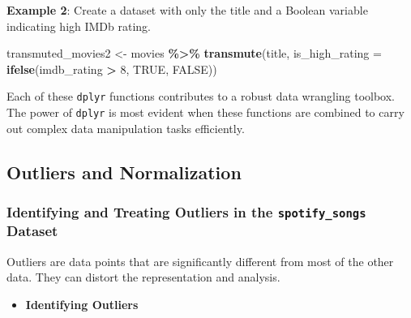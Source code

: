 \documentclass[
  b5paper]{book}
\newenvironment{Shaded}{\begin{snugshade}}{\end{snugshade}}
\newcommand{\AttributeTok}[1]{\textcolor[rgb]{0.13,0.29,0.53}{#1}}
\newcommand{\ConstantTok}[1]{\textcolor[rgb]{0.56,0.35,0.01}{#1}}
\newcommand{\DecValTok}[1]{\textcolor[rgb]{0.00,0.00,0.81}{#1}}
\newcommand{\FunctionTok}[1]{\textcolor[rgb]{0.13,0.29,0.53}{\textbf{#1}}}
\newcommand{\NormalTok}[1]{#1}
\newcommand{\OtherTok}[1]{\textcolor[rgb]{0.56,0.35,0.01}{#1}}
\newcommand{\SpecialCharTok}[1]{\textcolor[rgb]{0.81,0.36,0.00}{\textbf{#1}}}
\providecommand{\tightlist}{%
  \setlength{\itemsep}{0pt}\setlength{\parskip}{0pt}}
\begin{document}
\textbf{Example 2}: Create a dataset with only the title and a Boolean variable indicating high IMDb rating.

\begin{Shaded}
\begin{Highlighting}[]
\NormalTok{transmuted\_movies2 }\OtherTok{\textless{}{-}}\NormalTok{ movies }\SpecialCharTok{\%\textgreater{}\%}
  \FunctionTok{transmute}\NormalTok{(title, }\AttributeTok{is\_high\_rating =} \FunctionTok{ifelse}\NormalTok{(imdb\_rating }\SpecialCharTok{\textgreater{}} \DecValTok{8}\NormalTok{, }\ConstantTok{TRUE}\NormalTok{, }\ConstantTok{FALSE}\NormalTok{))}
\end{Highlighting}
\end{Shaded}

Each of these \texttt{dplyr} functions contributes to a robust data wrangling toolbox. The power of \texttt{dplyr} is most evident when these functions are combined to carry out complex data manipulation tasks efficiently.

\hypertarget{outliers-and-normalization}{%
\subsection*{Outliers and Normalization}\label{outliers-and-normalization}}

\hypertarget{identifying-and-treating-outliers-in-the-spotify_songs-dataset}{%
\subsubsection*{\texorpdfstring{Identifying and Treating Outliers in the \texttt{spotify\_songs} Dataset}{Identifying and Treating Outliers in the spotify\_songs Dataset}}\label{identifying-and-treating-outliers-in-the-spotify_songs-dataset}}

Outliers are data points that are significantly different from most of the other data. They can distort the representation and analysis.

\begin{itemize}
\tightlist
\item
  \textbf{Identifying Outliers}
\end{itemize}

\begin{Shaded}
\end{Shaded}
\end{document}
